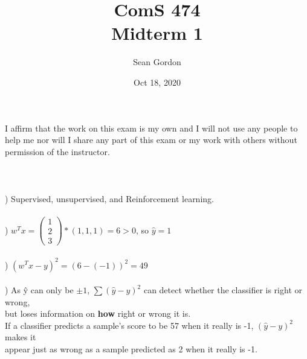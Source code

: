 \documentclass[12pt]{article}
\title{ComS 474\\Midterm 1}
\author{Sean Gordon}
\date{Oct 18, 2020}
\begin{document}
\maketitle



\noindent I affirm that the work on this exam is my own and I will not use any people to help me nor will I share any
part of this exam or my work with others without permission of the instructor.\\\\\\\\[-.4em]







) Supervised, unsupervised, and Reinforcement learning.\\



\noindent \hrulefill \\



) $w^Tx = 
\begin{pmatrix}
1\\ 2\\ 3
\end{pmatrix}
* (1, 1, 1) = 6 > 0$, so $\hat{y} = 1$\\[-.4em]



\noindent \hrulefill \\



) $(w^Tx-y)^2 = (6 - (-1))^2 = 49$\\[-.4em]



\noindent \hrulefill \\



) As \^{y} can only be $\pm1$, $\sum(\hat{y}-y)^2$ can detect whether the classifier is right or wrong, \\
but loses information on \textbf{how} right or wrong it is. \\
\indent If a classifier predicts a sample's score to be 57 when it really is -1, $(\hat{y}-y)^2$ makes it\\
appear just as wrong as a sample predicted as 2 when it really is -1.\\[-.4em]
\end{document}

